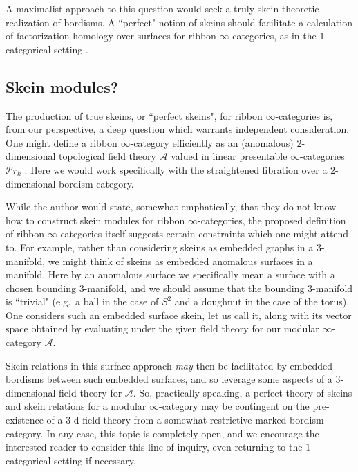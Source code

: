 \documentclass[reqno]{amsart}
\theoremstyle{definition}
\newcommand{\msc}[1]{\mathscr{#1}}
\renewcommand{\1}{\mathbf{1}}
\begin{document}
A maximalist approach to this question would seek a truly skein theoretic realization of bordisms. A ``perfect" notion of skeins should facilitate a calculation of factorization homology over surfaces for ribbon $\infty$-categories, as in the $1$-categorical setting \cite{brownhaioun}.


\subsection{Skein modules?}

The production of true skeins, or ``perfect skeins", for ribbon $\infty$-categories is, from our perspective, a deep question which warrants independent consideration. One might define a ribbon $\infty$-category efficiently as an (anomalous) $2$-dimensional topological field theory $\msc{A}$ valued in linear presentable $\infty$-categories $\msc{P}\!r_k$ \cite{mullerwoike23,steinebrunner}. Here we would work specifically with the straightened fibration over a $2$-dimensional bordism category. 
\par

While the author would state, somewhat emphatically, that they do not know how to construct skein modules for ribbon $\infty$-categories, the proposed definition of ribbon $\infty$-categories itself suggests certain constraints which one might attend to. For example, rather than considering skeins as embedded graphs in a $3$-manifold, we might think of skeins as embedded anomalous surfaces in a manifold. Here by an anomalous surface we specifically mean a surface with a chosen bounding $3$-manifold, and we should assume that the bounding $3$-manifold is ``trivial" (e.g.\ a ball in the case of $S^2$ and a doughnut in the case of the torus). One considers such an embedded surface skein, let us call it, along with its vector space obtained by evaluating under the given field theory for our modular $\infty$-category $\msc{A}$.
\par

Skein relations in this surface approach \emph{may} then be facilitated by embedded bordisms between such embedded surfaces, and so leverage some aspects of a $3$-dimensional field theory for $\msc{A}$. So, practically speaking, a perfect theory of skeins and skein relations for a modular $\infty$-category may be contingent on the pre-existence of a $3$-d field theory from a somewhat restrictive marked bordism category. In any case, this topic is completely open, and we encourage the interested reader to consider this line of inquiry, even returning to the $1$-categorical setting if necessary.
\end{document}
